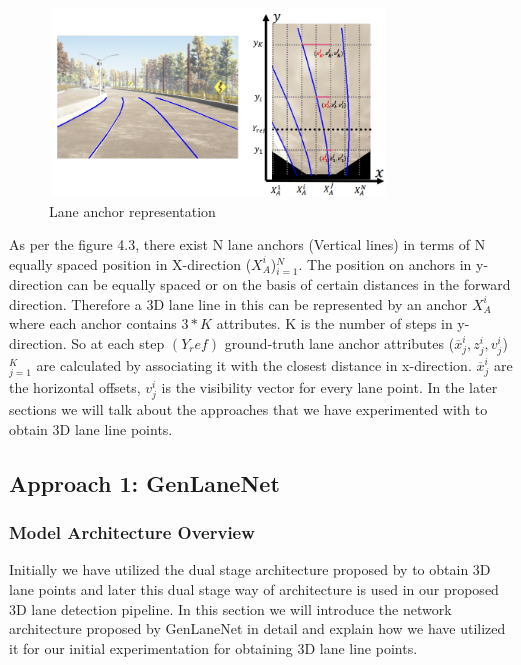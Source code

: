      \begin{figure}[h]
    \centering
    \includegraphics[width=9cm, height=5cm]{images/anchor_3Dlane.png}
    \caption{Lane anchor representation \cite{guo2020gen}}
    \end{figure}
    
    As per the figure 4.3, there exist N lane anchors (Vertical lines) in terms of N equally spaced position in X-direction ($X^{i}_{A}$)$^{N}_{i=1}$. The position on anchors in y-direction can be equally spaced or on the basis of certain distances in the forward direction. Therefore a 3D lane line in this can be represented by an anchor $X^{i}_{A}$ where each anchor contains $3*K$ attributes. K is the number of steps in y-direction. So at each step $(Y_ref)$ ground-truth lane anchor attributes ($\overline{x}^{i}_{j},z^{i}_{j},v^{i}_{j}$)$^{K}_{j=1}$ are calculated by associating it with the closest distance in x-direction. $\overline{x}^{i}_{j}$ are the horizontal offsets, $v^{i}_{j}$ is the visibility vector for every lane point.  In the later sections we will talk about the approaches that we have experimented with to obtain 3D lane line points. 
        
        \subsection{Approach 1: GenLaneNet\cite{guo2020gen}}
        
        \subsubsection{Model Architecture Overview}
        Initially we have utilized the dual stage architecture proposed by \cite{guo2020gen} to obtain 3D lane points and later this dual stage way of architecture is used in our proposed 3D lane detection pipeline. In this section we will introduce the network architecture proposed by GenLaneNet\cite{guo2020gen} in detail and explain how we have utilized it for our initial experimentation for obtaining 3D lane line points.
        
